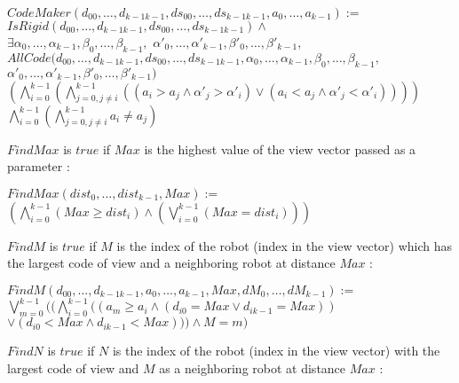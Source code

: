 \documentclass{article}
\begin{document}
\begin{center}
$CodeMaker(d_{00}, \ldots ,d_{k-1k-1}, ds_{00}, \ldots ,ds_{k-1k-1}, a_{0}, \ldots , a_{k-1}):=$\\
$IsRigid(d_{00}, \ldots ,d_{k-1k-1}, ds_{00}, \ldots ,ds_{k-1k-1}) \land $\\
$\exists \alpha_{0}, \dots, \alpha_{k-1}, \beta_{0}, \dots, \beta_{k-1},$
$\alpha'_{0}, \dots, \alpha'_{k-1}, \beta'_{0}, \dots, \beta'_{k-1},$\\
$AllCode(d_{00}, \ldots ,d_{k-1k-1}, ds_{00}, \ldots ,ds_{k-1k-1}, \alpha_{0}, \dots, \alpha_{k-1}, \beta_{0}, \dots, \beta_{k-1}, $\\
$\alpha'_{0}, \dots, \alpha'_{k-1}, \beta'_{0}, \dots, \beta'_{k-1})$\\
$(\bigwedge_{i = 0}^{k-1} (\bigwedge_{j = 0, j\not=i}^{k-1} ((a_{i} > a_{j} \land \alpha'_{j} > \alpha'_{i}) \lor (a_{i} < a_{j} \land \alpha'_{j} < \alpha'_{i}) ) ) )$\\
$\bigwedge_{i=0}^{k-1} (\bigwedge_{j=0, j \not= i}^{k-1} a_{i} \not= a_{j})$
\end{center}

$FindMax$ is $true$ if $Max$ is the highest value of the view vector passed as a parameter :

\begin{center}

$FindMax(dist_{0}, \ldots ,dist_{k-1}, Max):=$\\
$(\bigwedge_{i=0}^{k-1} (Max \geq dist_{i}) \land (\bigvee_{i=0}^{k-1} (Max = dist_{i})))$
\end{center}

$FindM$ is $true$ if $M$ is the index of the robot (index in the view vector) which has the largest code of view and a neighboring robot at distance $Max$ :

\begin{center}

$FindM(d_{00}, \ldots ,d_{k-1k-1}, a_{0}, \ldots , a_{k-1}, Max, dM_{0}, \dots, dM_{k-1}):=$\\
$\bigvee_{m=0}^{k-1}((\bigwedge_{i=0}^{k-1} ((a_{m} \geq a_i \land (d_{i0} = Max \lor d_{ik-1} = Max))$\\
$\lor (d_{i0} < Max \land d_{ik-1} < Max))) \land M = m )$
\end{center}

$FindN$ is $true$ if $N$ is the index of the robot (index in the view vector) with the largest code of view and $M$ as a neighboring robot at distance $Max$ :
\end{document}
